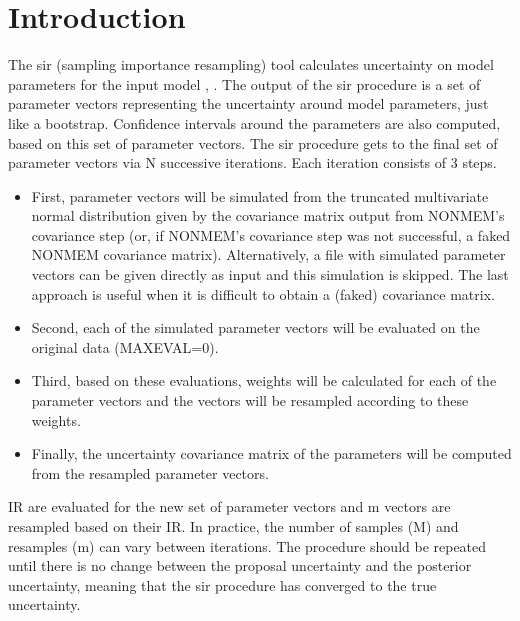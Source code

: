 
\usepackage{amsmath}



\maketitle

\newcommand{\guidetoolname}{sir}


\section{Introduction}
The sir (sampling importance resampling) tool calculates uncertainty on model parameters for the input model \cite{Dosne2013}, \cite{Dosne2015}. The output of the sir procedure is a set of parameter vectors representing the uncertainty around model parameters, just like a bootstrap. Confidence intervals around the parameters are also computed, based on this set of parameter vectors.
The sir procedure gets to the final set of parameter vectors via N successive iterations. Each iteration consists of 3 steps.
\begin{itemize}
\item First, parameter vectors will be simulated from the truncated multivariate normal distribution given by the covariance matrix output from NONMEM’s covariance step (or, if NONMEM’s covariance step was not successful, a faked NONMEM covariance matrix). Alternatively, a file with simulated parameter vectors can be given directly as input and this simulation is skipped. The last	approach is useful when it is difficult to obtain a (faked) covariance matrix.
\item Second, each of the simulated parameter vectors will be evaluated on the
original data (MAXEVAL=0).
\item Third, based on these evaluations, weights will be calculated for each of the parameter vectors and the vectors will be
resampled according to these weights.
\item Finally, the uncertainty covariance matrix of the parameters will be computed from the resampled parameter vectors.
\end{itemize}
IR are evaluated for the new set of parameter vectors and m vectors are resampled based on their IR. In practice, the number of samples (M) and resamples (m) can vary between iterations. The procedure should be repeated until there is no change between the proposal uncertainty and the posterior uncertainty, meaning that the sir procedure has converged to the true uncertainty.


